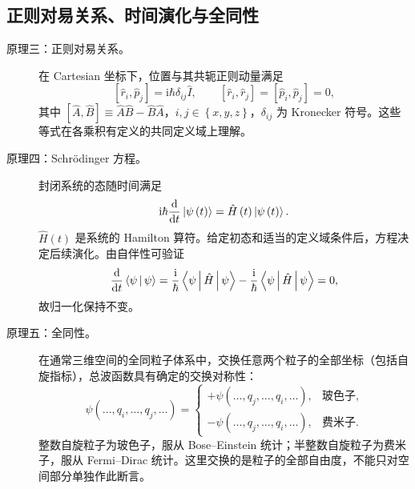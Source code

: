 \subsection{正则对易关系、时间演化与全同性}
\begin{description}
\item[原理三：正则对易关系。] 在 Cartesian 坐标下，位置与其共轭正则动量满足
\begin{equation}
\left[\hat r_i,\hat p_j\right]=\mathrm{i}\hbar\delta_{ij}\hat I,
\qquad \left[\hat r_i,\hat r_j\right]=\left[\hat p_i,\hat p_j\right]=0,
\end{equation}
其中 $\left[\hat A,\hat B\right]\equiv\hat A\hat B-\hat B\hat A$，$i,j\in\left\{x,y,z\right\}$，$\delta_{ij}$ 为 Kronecker 符号。这些等式在各乘积有定义的共同定义域上理解。

\item[原理四：Schrödinger 方程。] 封闭系统的态随时间满足
\begin{equation}
\mathrm{i}\hbar\frac{\mathrm{d}}{\mathrm{d}t}\Ket{\psi\left(t\right)}
=\hat H\left(t\right)\Ket{\psi\left(t\right)}.
\end{equation}
$\hat H\left(t\right)$ 是系统的 Hamilton 算符。给定初态和适当的定义域条件后，方程决定后续演化。由自伴性可验证
\begin{equation}
\frac{\mathrm{d}}{\mathrm{d}t}\Braket{\psi|\psi}
=\frac{\mathrm{i}}{\hbar}\Braket{\psi|\hat H|\psi}
-\frac{\mathrm{i}}{\hbar}\Braket{\psi|\hat H|\psi}=0,
\end{equation}
故归一化保持不变。

\item[原理五：全同性。] 在通常三维空间的全同粒子体系中，交换任意两个粒子的全部坐标（包括自旋指标），总波函数具有确定的交换对称性：
\begin{equation}
\psi\left(\ldots,q_i,\ldots,q_j,\ldots\right)
=\begin{cases}
+\psi\left(\ldots,q_j,\ldots,q_i,\ldots\right),&\text{玻色子},\\
-\psi\left(\ldots,q_j,\ldots,q_i,\ldots\right),&\text{费米子}.
\end{cases}
\end{equation}
整数自旋粒子为玻色子，服从 Bose--Einstein 统计；半整数自旋粒子为费米子，服从 Fermi--Dirac 统计。这里交换的是粒子的全部自由度，不能只对空间部分单独作此断言。
\end{description}

